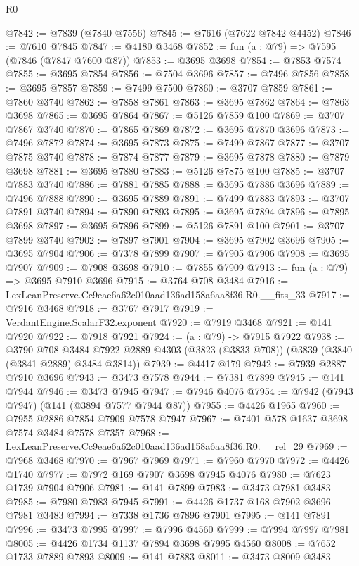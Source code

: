 \begin{lexlean}{R0}
\begin{coremodule}
@7842 := @7839 (@7840 @7556)
@7845 := @7616 (@7622 @7842 @4452)
@7846 := @7610 @7845
@7847 := @4180 @3468
@7852 := fun (a : @79) => @7595 (@7846 (@7847 @7600 @87))
@7853 := @3695 @3698
@7854 := @7853 @7574
@7855 := @3695 @7854
@7856 := @7504 @3696
@7857 := @7496 @7856
@7858 := @3695 @7857
@7859 := @7499 @7500
@7860 := @3707 @7859
@7861 := @7860 @3740
@7862 := @7858 @7861
@7863 := @3695 @7862
@7864 := @7863 @3698
@7865 := @3695 @7864
@7867 := @5126 @7859 @100
@7869 := @3707 @7867 @3740
@7870 := @7865 @7869
@7872 := @3695 @7870 @3696
@7873 := @7496 @7872
@7874 := @3695 @7873
@7875 := @7499 @7867
@7877 := @3707 @7875 @3740
@7878 := @7874 @7877
@7879 := @3695 @7878
@7880 := @7879 @3698
@7881 := @3695 @7880
@7883 := @5126 @7875 @100
@7885 := @3707 @7883 @3740
@7886 := @7881 @7885
@7888 := @3695 @7886 @3696
@7889 := @7496 @7888
@7890 := @3695 @7889
@7891 := @7499 @7883
@7893 := @3707 @7891 @3740
@7894 := @7890 @7893
@7895 := @3695 @7894
@7896 := @7895 @3698
@7897 := @3695 @7896
@7899 := @5126 @7891 @100
@7901 := @3707 @7899 @3740
@7902 := @7897 @7901
@7904 := @3695 @7902 @3696
@7905 := @3695 @7904
@7906 := @7378 @7899
@7907 := @7905 @7906
@7908 := @3695 @7907
@7909 := @7908 @3698
@7910 := @7855 @7909
@7913 := fun (a : @79) => @3695 @7910 @3696
@7915 := @3764 @708 @3484
@7916 := LexLeanPreserve.Cc9eae6a62c010aad136ad158a6aa8f36.R0.__fits_33
@7917 := @7916 @3468
@7918 := @3767 @7917
@7919 := VerdantEngine.ScalarF32.exponent
@7920 := @7919 @3468
@7921 := @141 @7920
@7922 := @7918 @7921
@7924 := (a : @79) -> @7915 @7922
@7938 := @3790
    @708
    @3484
    @7922
    @2889
    @4303
    (@3823 (@3833 @708))
    (@3839 (@3840 (@3841 @2889) @3484 @3814))
@7939 := @4417 @179
@7942 := @7939 @2887 @7910 @3696
@7943 := @3473 @7578
@7944 := @7381 @7899
@7945 := @141 @7944
@7946 := @3473 @7945
@7947 := @7946 @4076
@7954 := @7942 (@7943 @7947) (@141 (@3894 @7577 @7944 @87))
@7955 := @4426 @1965
@7960 := @7955 @2886 @7854 @7909 @7578 @7947
@7967 := @7401 @578 @1637 @3698 @7574 @3484 @7578 @7357
@7968 := LexLeanPreserve.Cc9eae6a62c010aad136ad158a6aa8f36.R0.__rel_29
@7969 := @7968 @3468
@7970 := @7967 @7969
@7971 := @7960 @7970
@7972 := @4426 @1740
@7977 := @7972 @169 @7907 @3698 @7945 @4076
@7980 := @7623 @1739 @7904 @7906
@7981 := @141 @7899
@7983 := @3473 @7981 @3483
@7985 := @7980 @7983 @7945
@7991 := @4426 @1737 @168 @7902 @3696 @7981 @3483
@7994 := @7338 @1736 @7896 @7901
@7995 := @141 @7891
@7996 := @3473 @7995
@7997 := @7996 @4560
@7999 := @7994 @7997 @7981
@8005 := @4426 @1734 @1137 @7894 @3698 @7995 @4560
@8008 := @7652 @1733 @7889 @7893
@8009 := @141 @7883
@8011 := @3473 @8009 @3483

\end{coremodule}
\end{lexlean}
